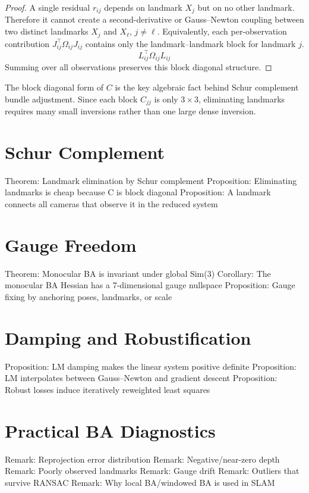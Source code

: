 \documentclass[11pt]{article}
\begin{document}
\begin{proof}
A single residual \(r_{ij}\) depends on landmark \(X_j\) but on no other landmark. Therefore it cannot create a second-derivative or Gauss--Newton coupling between two distinct landmarks \(X_j\) and \(X_\ell\), \(j\neq \ell\). Equivalently, each per-observation contribution \(J_{ij}^\top\Omega_{ij}J_{ij}\) contains only the landmark--landmark block for landmark \(j\). 
\[
L_{ij}^\top\Omega_{ij}L_{ij}
\]
Summing over all observations preserves this block diagonal structure.
\end{proof}

\begin{remark}
The block diagonal form of \(C\) is the key algebraic fact behind Schur complement bundle adjustment. Since each block \(C_{jj}\) is only \(3\times3\), eliminating landmarks requires many small inversions rather than one large dense inversion.
\end{remark}

\section{Schur Complement}

Theorem: Landmark elimination by Schur complement
Proposition: Eliminating landmarks is cheap because C is block diagonal
Proposition: A landmark connects all cameras that observe it in the reduced system

\section{Gauge Freedom}

Theorem: Monocular BA is invariant under global Sim(3)
Corollary: The monocular BA Hessian has a 7-dimensional gauge nullspace
Proposition: Gauge fixing by anchoring poses, landmarks, or scale

\section{Damping and Robustification}

Proposition: LM damping makes the linear system positive definite
Proposition: LM interpolates between Gauss--Newton and gradient descent
Proposition: Robust losses induce iteratively reweighted least squares

\section{Practical BA Diagnostics}

Remark: Reprojection error distribution
Remark: Negative/near-zero depth
Remark: Poorly observed landmarks
Remark: Gauge drift
Remark: Outliers that survive RANSAC
Remark: Why local BA/windowed BA is used in SLAM
\end{document}
